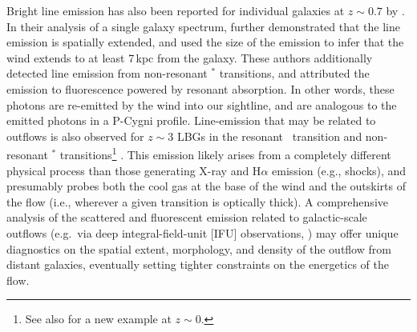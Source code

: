 \documentclass[12pt,preprint]{aastex}
\begin{document}
Bright  line emission has also been
reported for individual galaxies at $z \sim 0.7$ by \cite[][see also
Rubin et al\ 2011, in prep.]{rubin+10c}.
In their analysis of a single galaxy spectrum, \cite{rubin+10c}
further demonstrated that the  line emission is spatially
extended, and used the size of the emission to infer that the wind 
extends to at least 7\,kpc from the galaxy.
These authors additionally detected line
emission from non-resonant $^*$ transitions, and attributed
the emission to fluorescence powered by  resonant
absorption.  In other words, these photons are re-emitted by the wind
into our sightline, and are analogous to the emitted photons in a P-Cygni profile.
Line-emission that may be related to outflows is
also observed for $z \sim 3$ LBGs in the resonant \lya\ transition
and non-resonant $^*$ transitions\footnote{See also
  \cite{france10} for a new example at $z \sim 0$.} \citep{prs+02,shapley03}.
This emission likely arises from a completely different
physical process than those generating X-ray and H$\alpha$ emission
(e.g., shocks), and presumably probes both the cool gas at the base of
the wind and the outskirts of the flow (i.e., wherever a given
transition is optically thick).
A comprehensive analysis of the %
scattered and fluorescent emission
related to galactic-scale outflows
(e.g.\ via deep integral-field-unit [IFU] observations,
\citealt{ssb+05,wsg08}) 
may offer unique
diagnostics on the spatial extent, morphology, and density of the outflow 
from distant galaxies,
eventually
setting tighter constraints on the energetics of the flow.   

\end{document}
